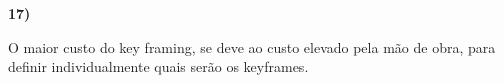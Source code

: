 \textbf{17)} 

O maior custo do key framing, se deve ao custo elevado pela mão de obra, para 
definir individualmente quais serão os keyframes.


